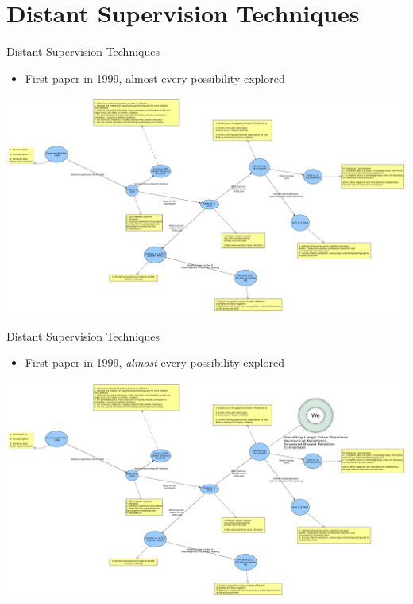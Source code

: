 \documentclass{beamer}
\begin{document}
\section{Distant Supervision Techniques}
\begin{frame}{Distant Supervision Techniques}
 \begin{itemize}
  \item First paper in 1999, almost every possibility explored
 \end{itemize}
\begin{center}
 \includegraphics[scale=0.12]{./imgs/dsreadings.pdf}
\end{center}
\end{frame}
\begin{frame}{Distant Supervision Techniques}
 \begin{itemize}
  \item First paper in 1999, \emph{almost} every possibility explored
 \end{itemize}
\begin{center}
 \includegraphics[scale=0.12]{./imgs/us.pdf}
\end{center}

\end{frame}
\end{document}
